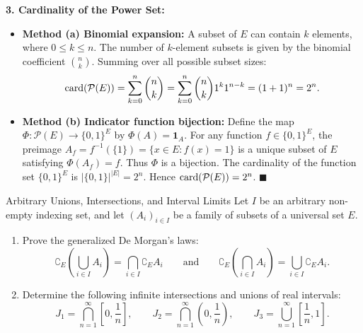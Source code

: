 \begin{solution}
\textbf{3. Cardinality of the Power Set:}
\begin{itemize}[leftmargin=1.5em,itemsep=2pt]
  \item \textbf{Method (a) Binomial expansion:} A subset of $E$ can contain $k$ elements, where $0 \le k \le n$. The number of $k$-element subsets is given by the binomial coefficient $\binom{n}{k}$. Summing over all possible subset sizes:
  \[
  \operatorname{card}(\mathcal{P}(E)) = \sum_{k=0}^n \binom{n}{k} = \sum_{k=0}^n \binom{n}{k} 1^k 1^{n-k} = (1 + 1)^n = 2^n.
  \]
  \item \textbf{Method (b) Indicator function bijection:}
  Define the map $\Phi: \mathcal{P}(E) \to \{0, 1\}^E$ by $\Phi(A) = \mathbf{1}_A$.
  For any function $f \in \{0, 1\}^E$, the preimage $A_f = f^{-1}(\{1\}) = \{x \in E : f(x) = 1\}$ is a unique subset of $E$ satisfying $\Phi(A_f) = f$. Thus $\Phi$ is a bijection.
  The cardinality of the function set $\{0, 1\}^E$ is $|\{0, 1\}|^{|E|} = 2^n$. Hence $\operatorname{card}(\mathcal{P}(E)) = 2^n$. \hfill $\blacksquare$
\end{itemize}
\end{solution}

\begin{exercise}{Arbitrary Unions, Intersections, and Interval Limits}
Let $I$ be an arbitrary non-empty indexing set, and let $(A_i)_{i \in I}$ be a family of subsets of a universal set $E$.
\begin{enumerate}[leftmargin=1.5em,itemsep=2pt]
  \item Prove the generalized De Morgan's laws:
  \[
  \complement_E \left(\bigcup_{i \in I} A_i\right) = \bigcap_{i \in I} \complement_E A_i \qquad \text{and} \qquad \complement_E \left(\bigcap_{i \in I} A_i\right) = \bigcup_{i \in I} \complement_E A_i.
  \]
  \item Determine the following infinite intersections and unions of real intervals:
  \[
  J_1 = \bigcap_{n=1}^\infty \left[0, \frac{1}{n}\right], \qquad J_2 = \bigcap_{n=1}^\infty \left(0, \frac{1}{n}\right), \qquad J_3 = \bigcup_{n=1}^\infty \left[\frac{1}{n}, 1\right].
  \]
\end{enumerate}
\end{exercise}

\begin{tabletworkspace}[5.0cm]
\end{tabletworkspace}

